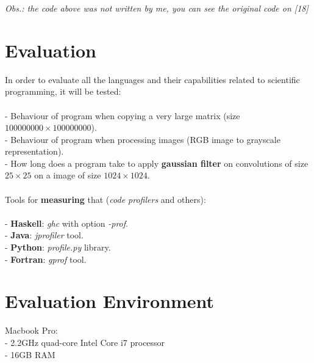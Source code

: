 \documentclass[conference]{IEEEtran}
\begin{document}
\textit{Obs.: the code above was not written by me, you can see the original code on [18]}

\section{Evaluation}
In order to evaluate all the languages and their capabilities related to scientific programming, it will be tested:
\\\\
- Behaviour of program when copying a very large matrix (size $100000000 \times 100000000$).\\
- Behaviour of program when processing images (RGB image to grayscale representation).\\
- How long does a program take to apply \textbf{gaussian filter} on convolutions of size $25 \times 25$ on a image of size $1024 \times 1024$.\\
\\
Tools for \textbf{measuring} that (\textit{code profilers} and others):\\
\\
- \textbf{Haskell}: \textit{ghc} with option \textit{-prof}.\\
- \textbf{Java}: \textit{jprofiler} tool.\\
- \textbf{Python}: \textit{profile.py} library.\\
- \textbf{Fortran}: \textit{gprof} tool.\\

\section{Evaluation Environment}
Macbook Pro:\\
- 2.2GHz quad-core Intel Core i7 processor\\
- 16GB RAM
\end{document}
